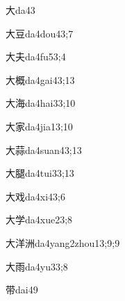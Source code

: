 \begin{verbete}{大}{da4}{3}
\end{verbete}

\begin{verbete}{大豆}{da4dou4}{3;7}
\end{verbete}

\begin{verbete}{大夫}{da4fu5}{3;4}
\end{verbete}

\begin{verbete}{大概}{da4gai4}{3;13}
\end{verbete}

\begin{verbete}{大海}{da4hai3}{3;10}
\end{verbete}

\begin{verbete}{大家}{da4jia1}{3;10}
\end{verbete}

\begin{verbete}{大蒜}{da4suan4}{3;13}
\end{verbete}

\begin{verbete}{大腿}{da4tui3}{3;13}
\end{verbete}

\begin{verbete}{大戏}{da4xi4}{3;6}
\end{verbete}

\begin{verbete}{大学}{da4xue2}{3;8}
\end{verbete}

\begin{verbete}{大洋洲}{da4yang2zhou1}{3;9;9}
\end{verbete}

\begin{verbete}{大雨}{da4yu3}{3;8}
\end{verbete}

\begin{verbete}{带}{dai4}{9}
\end{verbete}

